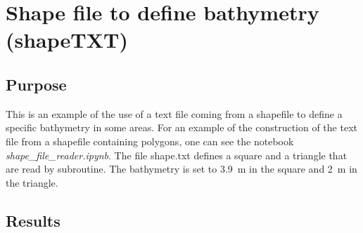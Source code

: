 \chapter{Shape file to define bathymetry (shapeTXT)}

\section{Purpose}
This is an example of the use of a text file coming from a shapefile to define
a specific bathymetry in some areas.
For an example of the construction of the text file from a shapefile containing
polygons, one can see the notebook {\it shape\_file\_reader.ipynb}.
The file shape.txt defines a square and a triangle that are read by
 subroutine.
The bathymetry is set to 3.9~m in the square and 2~m in the triangle. 

\section{Results}

\begin{figure}[htbp]
\end{figure}
